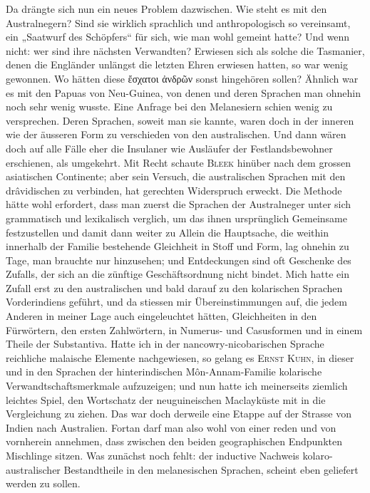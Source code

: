 {Da drängte sich nun ein neues Problem dazwischen. Wie steht es mit den Australnegern? Sind sie wirklich sprachlich und anthropologisch so vereinsamt, ein „Saatwurf des Schöpfers“ für sich, wie man wohl gemeint hatte? Und wenn nicht: wer sind ihre nächsten Verwandten? Erwiesen sich als solche die Tasmanier, denen die Engländer unlängst die letzten Ehren erwiesen hatten, so war wenig gewonnen. Wo hätten diese ἔσχατοι ἀνδρῶν sonst hingehören sollen? Ähnlich war es mit den Papuas von Neu-Guinea, von denen und deren Sprachen man ohnehin noch sehr wenig wusste. Eine Anfrage bei den Melanesiern schien wenig zu versprechen. Deren Sprachen, soweit man sie \label{sp.281} kannte, waren doch in der inneren wie der äusseren Form zu verschieden von den australischen. Und dann wären doch auf alle Fälle eher die Insulaner wie Ausläufer der Festlandsbewohner erschienen, als umgekehrt. Mit Recht schaute \textsc{Bleek} hinüber nach dem grossen asiatischen Continente; aber sein Versuch, die australischen Sprachen mit den drâvidischen zu verbinden, hat gerechten Widerspruch erweckt. Die Methode hätte wohl erfordert, dass man zuerst die Sprachen der Australneger unter sich grammatisch und lexikalisch verglich, um das ihnen ursprünglich Gemeinsame festzustellen und damit dann weiter zu  Allein die Hauptsache, die weithin innerhalb der Familie bestehende Gleichheit in Stoff und Form, lag ohnehin zu Tage, man brauchte nur hinzusehen; und Entdeckungen sind oft Geschenke des Zufalls, der sich an die zünftige Geschäftsordnung nicht bindet. Mich hatte ein Zufall erst zu den australischen und bald darauf zu den kolarischen Sprachen Vorderindiens geführt, und da stiessen mir Übereinstimmungen auf, die jedem Anderen in meiner Lage auch eingeleuchtet hätten, Gleichheiten in den Fürwörtern, den ersten Zahlwörtern, in Numerus- und Casusformen und in einem Theile der Substantiva.  Hatte ich in der nancowry-nicobarischen Sprache reichliche malaische Elemente nachgewiesen, so gelang es \textsc{Ernst Kuhn}, in dieser und in den Sprachen der hinterindischen Môn-Annam-Familie kolarische Verwandtschaftsmerkmale aufzuzeigen; und nun hatte ich meinerseits ziemlich leichtes Spiel, den Wortschatz der neuguineischen Maclayküste mit in die Vergleichung zu ziehen. Das war doch derweile eine Etappe auf der Strasse von Indien nach Australien. Fortan darf man also wohl von einer  \label{fp.275} reden und von vornherein annehmen, dass zwischen den beiden geographischen Endpunkten Mischlinge sitzen. Was zunächst noch fehlt: der inductive Nachweis kolaro-australischer Bestandtheile in den melanesischen Sprachen, scheint eben geliefert werden zu sollen.

}
